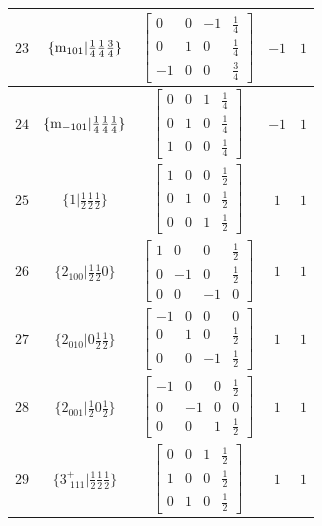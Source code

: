 \documentclass[fleqn,8pt]{jsarticle}
\begin{document}
\begin{longtable}{ccccc}
$ 23 $ & $ \{{\rm m}_{101}|\frac{1}{4} \frac{1}{4} \frac{3}{4}\} $ & $ \begin{bmatrix} 0 & 0 & -1 & \frac{1}{4} \\ 0 & 1 & 0 & \frac{1}{4} \\ -1 & 0 & 0 & \frac{3}{4} \end{bmatrix} $ & $ -1 $ & $ 1 $ \\ \hline
$ 24 $ & $ \{{\rm m}_{-101}|\frac{1}{4} \frac{1}{4} \frac{1}{4}\} $ & $ \begin{bmatrix} 0 & 0 & 1 & \frac{1}{4} \\ 0 & 1 & 0 & \frac{1}{4} \\ 1 & 0 & 0 & \frac{1}{4} \end{bmatrix} $ & $ -1 $ & $ 1 $ \\ \hline
$ 25 $ & $ \{1|\frac{1}{2} \frac{1}{2} \frac{1}{2}\} $ & $ \begin{bmatrix} 1 & 0 & 0 & \frac{1}{2} \\ 0 & 1 & 0 & \frac{1}{2} \\ 0 & 0 & 1 & \frac{1}{2} \end{bmatrix} $ & $ 1 $ & $ 1 $ \\ \hline
$ 26 $ & $ \{2{}_{100}|\frac{1}{2} \frac{1}{2} 0\} $ & $ \begin{bmatrix} 1 & 0 & 0 & \frac{1}{2} \\ 0 & -1 & 0 & \frac{1}{2} \\ 0 & 0 & -1 & 0 \end{bmatrix} $ & $ 1 $ & $ 1 $ \\ \hline
$ 27 $ & $ \{2{}_{010}|0 \frac{1}{2} \frac{1}{2}\} $ & $ \begin{bmatrix} -1 & 0 & 0 & 0 \\ 0 & 1 & 0 & \frac{1}{2} \\ 0 & 0 & -1 & \frac{1}{2} \end{bmatrix} $ & $ 1 $ & $ 1 $ \\ \hline
$ 28 $ & $ \{2{}_{001}|\frac{1}{2} 0 \frac{1}{2}\} $ & $ \begin{bmatrix} -1 & 0 & 0 & \frac{1}{2} \\ 0 & -1 & 0 & 0 \\ 0 & 0 & 1 & \frac{1}{2} \end{bmatrix} $ & $ 1 $ & $ 1 $ \\ \hline
$ 29 $ & $ \{3^{+}_{\,\,111}|\frac{1}{2} \frac{1}{2} \frac{1}{2}\} $ & $ \begin{bmatrix} 0 & 0 & 1 & \frac{1}{2} \\ 1 & 0 & 0 & \frac{1}{2} \\ 0 & 1 & 0 & \frac{1}{2} \end{bmatrix} $ & $ 1 $ & $ 1 $ \\ \hline

\end{longtable}
\end{document}
